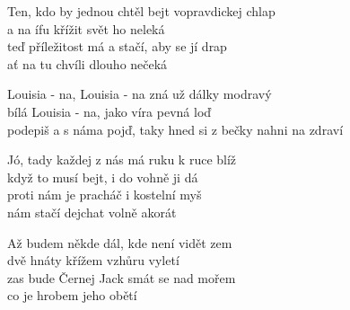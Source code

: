 
\ve{}
Ten, kdo by jednou chtěl bejt vopravdickej chlap\\
a na ífu křížit svět ho neleká\\
teď příležitost má a stačí, aby se jí drap\\
ať na tu chvíli dlouho nečeká

\cho{}
Louisia - na, Louisia - na zná už dálky modravý \\
bílá Louisia - na, jako víra pevná loď\\
podepiš a s náma pojď, taky hned si z bečky nahni na zdraví

\ve{}
Jó, tady každej z nás má ruku k ruce blíž\\
když to musí bejt, i do vohně ji dá\\
proti nám je pracháč i kostelní myš\\
nám stačí dejchat volně akorát

\cho{}

\ve{}
Až budem někde dál, kde není vidět zem\\
dvě hnáty křížem vzhůru vyletí\\
zas bude Černej Jack smát se nad mořem\\
co je hrobem jeho obětí

\cho{}

\esong{}